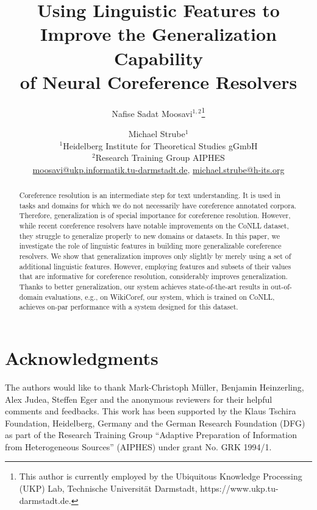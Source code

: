 \documentclass[11pt,a4paper]{article}
\title{Using Linguistic Features to Improve the Generalization Capability \\of Neural Coreference Resolvers}
\author{Nafise Sadat Moosavi$^{1,2}$\thanks{\hspace{0.7em}This author is currently employed by the Ubiquitous Knowledge Processing (UKP) Lab, Technische Universit\"at Darmstadt,  https://www.ukp.tu-darmstadt.de.} \and Michael Strube$^{1}$
       \\
       $^1$Heidelberg Institute for Theoretical Studies gGmbH\\
       $^2$Research Training Group AIPHES\\
	   \small \url{moosavi@ukp.informatik.tu-darmstadt.de}, \url{michael.strube@h-its.org}}
\date{}
\begin{document}
\maketitle
\begin{abstract}
Coreference resolution is an intermediate step for text understanding.
It is used in tasks and domains for which we do not necessarily have coreference annotated corpora.
Therefore, generalization is of special importance for coreference resolution.
However, while recent coreference resolvers have notable improvements on the CoNLL dataset,
they struggle to generalize properly to new domains or datasets.
In this paper, we investigate the role of linguistic features in building more generalizable coreference resolvers.
We show that generalization improves only slightly by merely using a set of additional linguistic features.
However, employing features and subsets of their values that are informative for coreference resolution,
considerably improves generalization.
Thanks to better generalization, our system
achieves state-of-the-art results in out-of-domain evaluations,
e.g., on WikiCoref, 
our system, which is trained on CoNLL, achieves on-par performance with a system designed for this dataset.

\end{abstract}









%


\section*{Acknowledgments} The authors would like to thank Mark-Christoph M\"uller, Benjamin Heinzerling, Alex Judea, Steffen Eger and the anonymous reviewers for their helpful comments and feedbacks. 
This work has been supported by the Klaus Tschira Foundation, Heidelberg,
Germany and the German Research
Foundation (DFG) as part of the Research Training Group
“Adaptive  Preparation  of  Information  from  Heterogeneous  Sources”  (AIPHES) under  grant  No.
GRK 1994/1. 



\end{document}
